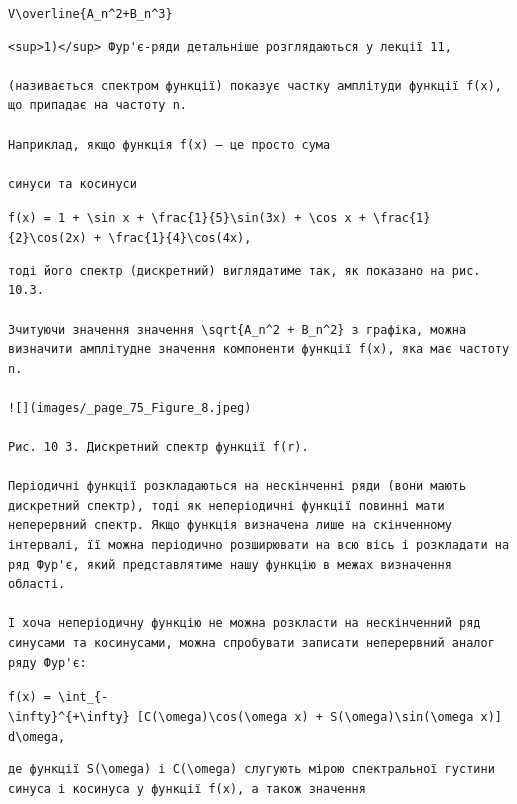 \documentclass[
  ukrainian,
]{article}
\begin{document}
\texttt{V\textbackslash{}overline\{A\_n\^{}2+B\_n\^{}3\}}

\begin{verbatim}
<sup>1)</sup> Фур'є-ряди детальніше розглядаються у лекції 11,

(називається спектром функції) показує частку амплітуди функції f(x), що припадає на частоту n.

Наприклад, якщо функція f(x) — це просто сума

синуси та косинуси
\end{verbatim}

\texttt{f(x)\ =\ 1\ +\ \textbackslash{}sin\ x\ +\ \textbackslash{}frac\{1\}\{5\}\textbackslash{}sin(3x)\ +\ \textbackslash{}cos\ x\ +\ \textbackslash{}frac\{1\}\{2\}\textbackslash{}cos(2x)\ +\ \textbackslash{}frac\{1\}\{4\}\textbackslash{}cos(4x),}

\begin{verbatim}
тоді його спектр (дискретний) виглядатиме так, як показано на рис. 10.3.

Зчитуючи значення значення \sqrt{A_n^2 + B_n^2} з графіка, можна визначити амплітудне значення компоненти функції f(x), яка має частоту n.

![](images/_page_75_Figure_8.jpeg)

Рис. 10 3. Дискретний спектр функції f(r).

Періодичні функції розкладаються на нескінченні ряди (вони мають дискретний спектр), тоді як неперіодичні функції повинні мати неперервний спектр. Якщо функція визначена лише на скінченному інтервалі, її можна періодично розширювати на всю вісь і розкладати на ряд Фур'є, який представлятиме нашу функцію в межах визначення області.

І хоча неперіодичну функцію не можна розкласти на нескінченний ряд синусами та косинусами, можна спробувати записати неперервний аналог ряду Фур'є:
\end{verbatim}

\texttt{f(x)\ =\ \textbackslash{}int\_\{-\textbackslash{}infty\}\^{}\{+\textbackslash{}infty\}\ {[}C(\textbackslash{}omega)\textbackslash{}cos(\textbackslash{}omega\ x)\ +\ S(\textbackslash{}omega)\textbackslash{}sin(\textbackslash{}omega\ x){]}\ d\textbackslash{}omega,}

\begin{verbatim}
де функції S(\omega) і C(\omega) слугують мірою спектральної густини синуса і косинуса у функції f(x), а також значення
\end{verbatim}
\end{document}
